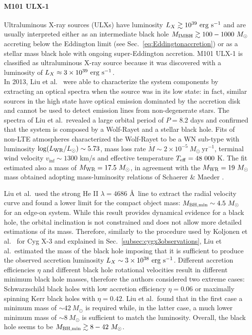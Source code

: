 \documentclass[a4paper,titlepage]{book}     	%
\newcommand{\sun}{\ensuremath{_\odot}}
\newcommand{\mdot}{\ensuremath{\dot{M}}}
\newcommand{\msun}{\ensuremath{M\sun}}
\newcommand{\lsun}{L_{\odot}}
\newcommand{\yr}{\text{yr}}
\newcommand{\mwr}{\ensuremath{M_\textup{WR}}}
\begin{document}
\paragraph{M101 ULX-1} Ultraluminous X-ray sources (ULXs) have luminosity $L_X \gtrsim 10^{39}~\rm erg~s^{-1}$ and are usually interpreted either as an intermediate black hole $M_{\rm IMBH} \gtrsim 100-1000~\msun$ accreting below the Eddington limit (see Sec.\ \ref{eq:Eddingtonaccretion}) or as a stellar mass black hole with ongoing super-Eddington accretion. M101 ULX-1 is classified as ultraluminous X-ray source because it was discovered with a luminosity of $L_X \approx 3 \times 10^{39}~\rm erg~s^{-1}$. \\

In 2013, Liu et al.\ \cite{M101ULX-1_Liu2013} were able to characterize the system components by extracting an optical spectra when the source was in its low state: in fact, similar sources in the high state have optical emission dominated by the accretion disk and cannot be used to detect emission lines from non-degenerate stars. The spectra of Liu et al.\ revealed a large orbital period of $P=8.2$ days and confirmed that the system is composed by a Wolf-Rayet and a stellar black hole. Fits of non-LTE atmospheres characterized the Wolf-Rayet to be a WN sub-type with luminosity $\log(L_{\rm WR}/\lsun) \sim 5.73$, mass loss rate $\mdot \sim 2 \times 10^{-5}~\msun~\yr^{-1}$, terminal wind velocity $v_{\inf} \sim 1300$ km/s and effective temperature $T_{\rm eff} = 48~000$ K. The fit estimated also a mass of $\mwr = 17.5~\msun$, in agreement with the $\mwr = 19~\msun$ mass obtained adopting mass-luminosity relations of Schaerer \& Maeder \cite{schaerer1992MLrelationWR}.

Liu et al.\ used the strong He II $\lambda=4686$ \AA ~line to extract the radial velocity curve and found a lower limit for the compact object mass: $M_{\rm BH, min} \sim 4.5~\msun$ for an edge-on system. While this result provides dynamical evidence for a black hole, the orbital inclination is not constrained and does not allow more detailed estimations of its mass. Therefore, similarly to the procedure used by Koljonen et al.\ \cite{CygX-3_Koljonen2017} for Cyg X-3 and explained in Sec.\ \ref{subsec:cygx3observations}, Liu et al.\ estimated the mass of the black hole imposing that it is sufficient to produce the observed accretion luminosity $L_X \sim 3 \times 10^{38}~\rm erg~s^{-1}$. Different accretion efficiencies $\eta$ and different black hole rotational velocities result in different minimum black hole masses, therefore the authors considered two extreme cases: Schwarzschild black holes with low accretion efficiency $\eta = 0.06$ or maximally spinning Kerr black holes with $\eta = 0.42$. Liu et al.\ found that in the first case a minimum mass of $\sim 42~\msun$ is required while, in the latter case, a much lower minimum mass of $\sim 8~\msun$ is sufficient to match the luminosity. Overall, the black hole seems to be $M_{\rm BH, min} \gtrsim 8-42~\msun$. 
\end{document}
